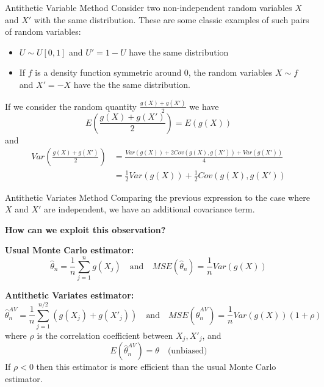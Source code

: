 \documentclass[8pt]{beamer}
\begin{document}
\begin{frame}{Antithetic Variable Method}
Consider two \alert{non-independent} random variables $X$ and $X'$ with the same distribution. These are some classic examples of such pairs of random variables:

\begin{itemize}
	\item $U \sim U[0,1]$ and $U'=1-U$ have the same distribution
	\item If $f$ is a density function symmetric around 0, the random variables $X \sim f$ and $X'=-X$  have the the same distribution.
\end{itemize}

If we consider the random quantity $\frac{g(X)+g(X')}{2}$ we have 
\begin{equation*}
E\left(\frac{g(X)+g(X')}{2}\right)=E(g(X))
\end{equation*}
and
\begin{align*}
Var\left(\frac{g(X)+g(X')}{2}\right) &= \frac{Var(g(X))+2Cov(g(X),g(X'))+Var(g(X'))}{4}\\
									 &= \frac{1}{2}Var(g(X))+\frac{1}{2}Cov(g(X),g(X'))
\end{align*}
\end{frame}


\begin{frame}{Antithetic Variates Method}
Comparing the previous expression to the case where $X$ and $X'$ are independent, we have an additional covariance term.

\vspace{1mm}

\textbf{How can we exploit this observation?}

\vspace{1mm}

\textbf{Usual Monte Carlo estimator:} 
\begin{equation*}
\hat{\theta}_n=\frac{1}{n}\sum_{j=1}^n g(X_j) \quad \text{and} \quad MSE(\hat{\theta}_n)=\frac{1}{n}Var(g(X))
\end{equation*}

\vspace{1mm}

\textbf{Antithetic Variates estimator:} 
\begin{equation*}
	\hat{\theta}_n^{AV}=\frac{1}{n}\sum_{j=1}^{n/2} (g(X_j)+g(X'_j)) \quad \text{and} \quad MSE(\hat{\theta}_n^{AV})=\frac{1}{n}Var(g(X))(1+\rho)
\end{equation*}
where $\rho$ is the correlation coefficient between $X_j,X'_j$, and
\begin{equation*}
	E(\hat{\theta}_n^{AV})=\theta \quad \text{(unbiased)}
\end{equation*}
If $\rho<0$ then this estimator is more efficient than the usual Monte Carlo estimator.
\end{frame}
\end{document}
